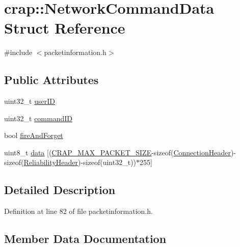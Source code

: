 \hypertarget{structcrap_1_1_network_command_data}{}\section{crap\+:\+:Network\+Command\+Data Struct Reference}
\label{structcrap_1_1_network_command_data}


{\ttfamily \#include $<$packetinformation.\+h$>$}

\subsection*{Public Attributes}
\begin{DoxyCompactItemize}
\item 
uint32\+\_\+t \hyperlink{structcrap_1_1_network_command_data_a91ac863907f7ea4beb9f4584b71909ba}{user\+I\+D}
\item 
uint32\+\_\+t \hyperlink{structcrap_1_1_network_command_data_a93c879cf1159768fa568e9c4a0364f44}{command\+I\+D}
\item 
bool \hyperlink{structcrap_1_1_network_command_data_a686dbe93704fdf7b08a69ff62c34daf8}{fire\+And\+Forget}
\item 
uint8\+\_\+t \hyperlink{structcrap_1_1_network_command_data_aa159e9a9585623cee765622ea6289ec0}{data} \mbox{[}(\hyperlink{packetinformation_8h_a0811d6d7f9c275bf8f3af82d61a31e0f}{C\+R\+A\+P\+\_\+\+M\+A\+X\+\_\+\+P\+A\+C\+K\+E\+T\+\_\+\+S\+I\+Z\+E}-\/sizeof(\hyperlink{structcrap_1_1_connection_header}{Connection\+Header})-\/sizeof(\hyperlink{structcrap_1_1_reliability_header}{Reliability\+Header})-\/sizeof(uint32\+\_\+t))$\ast$255\mbox{]}
\end{DoxyCompactItemize}


\subsection{Detailed Description}


Definition at line 82 of file packetinformation.\+h.



\subsection{Member Data Documentation}
\hypertarget{structcrap_1_1_network_command_data_a93c879cf1159768fa568e9c4a0364f44}{}
